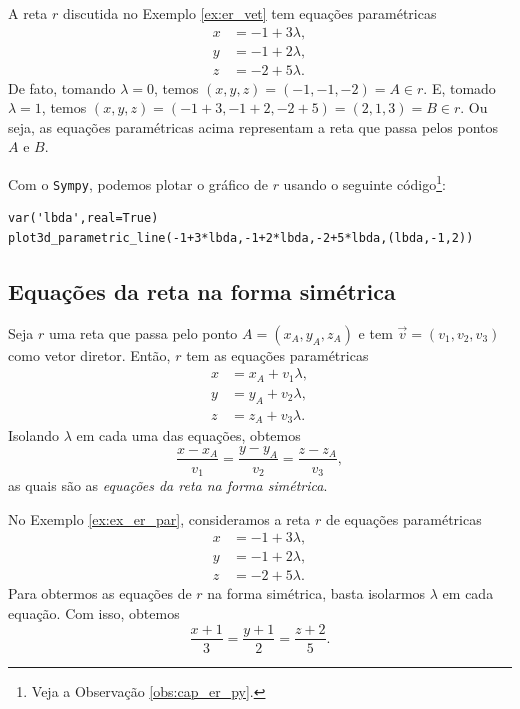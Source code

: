 \begin{ex}\label{ex:ex_er_par}
  A reta $r$ discutida no Exemplo \ref{ex:er_vet} tem equações paramétricas
  \begin{align}
    x &= -1 + 3\lambda,\\
    y &= -1 + 2\lambda,\\
    z &= -2 + 5\lambda.
  \end{align}
  De fato, tomando $\lambda = 0$, temos $(x,y,z) = (-1,-1,-2) = A\in r$. E, tomado $\lambda = 1$, temos $(x,y,z) = (-1+3,-1+2,-2+5) = (2,1,3) = B\in r$. Ou seja, as equações paramétricas acima representam a reta que passa pelos pontos $A$ e $B$.

  \ifispython
  Com o \verb+Sympy+, podemos plotar o gráfico de $r$ usando o seguinte código\footnote{Veja a Observação \ref{obs:cap_er_py}.}:
\begin{verbatim}
var('lbda',real=True)
plot3d_parametric_line(-1+3*lbda,-1+2*lbda,-2+5*lbda,(lbda,-1,2))
\end{verbatim}
  \fi
\end{ex}

\subsection{Equações da reta na forma simétrica}

Seja $r$ uma reta que passa pelo ponto $A = (x_A,y_A,z_A)$ e tem $\vec{v} = (v_1,v_2,v_3)$ como vetor diretor. Então, $r$ tem as equações paramétricas
\begin{align}
  x &= x_A + v_1\lambda,\\
  y &= y_A + v_2\lambda,\\
  z &= z_A + v_3\lambda.
\end{align}
Isolando $\lambda$ em cada uma das equações, obtemos
\begin{equation}
  \frac{x-x_A}{v_1} = \frac{y-y_A}{v_2} = \frac{z-z_A}{v_3},
\end{equation}
as quais são as \emph{equações da reta na forma simétrica}.

\begin{ex}
  No Exemplo \ref{ex:ex_er_par}, consideramos a reta $r$ de equações paramétricas
  \begin{align}
    x &= -1 + 3\lambda,\\
    y &= -1 + 2\lambda,\\
    z &= -2 + 5\lambda.    
  \end{align}
  Para obtermos as equações de $r$ na forma simétrica, basta isolarmos $\lambda$ em cada equação. Com isso, obtemos
  \begin{equation}
    \frac{x+1}{3} = \frac{y+1}{2} = \frac{z+2}{5}.
  \end{equation}
\end{ex}

